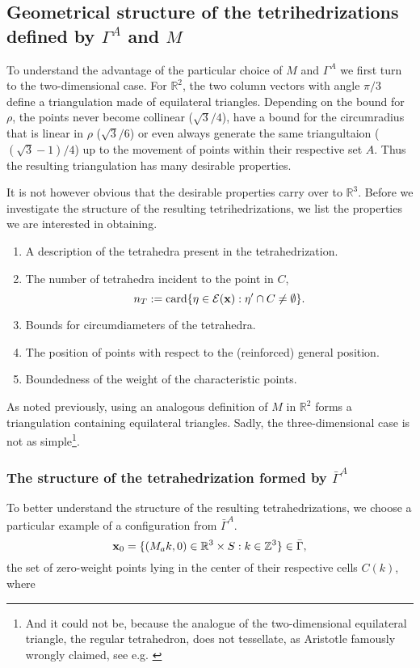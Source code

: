 \subsection{Geometrical structure of the tetrihedrizations defined by $\Gamma^A$ and $M$}
To understand the advantage of the particular choice of $M$ and $\Gamma^A$ we first turn to the two-dimensional case. For $\mathbb R^2$, the two column vectors with angle $\pi/3$ define a triangulation made of equilateral triangles. Depending on the bound for $\rho$, the points never become collinear ($\sqrt 3/4$), have a bound for the circumradius that is linear in $\rho$ ($\sqrt 3/6$) or even always generate the same triangultaion ($(\sqrt 3 - 1)/4$) up to the movement of points within their respective set $A$. Thus the resulting triangulation has many desirable properties. \newline

It is not however obvious that the desirable properties carry over to $\mathbb R^3$. Before we investigate the structure of the resulting tetrihedrizations, we list the properties we are interested in obtaining.
\begin{enumerate}
	\item A description of the tetrahedra present in the tetrahedrization.
	\item The number of tetrahedra incident to the point in $C$,  
		$$n_T := \mathrm{card} \{\eta \in \mathcal E({\mathbf{x}}): \eta' \cap C \neq \emptyset\}.$$
	\item Bounds for circumdiameters of the tetrahedra.
	\item The position of points with respect to the (reinforced) general position.  
	\item Boundedness of the weight of the characteristic points.
\end{enumerate}

As noted previously, using an analogous definition of $M$ in $\mathbb R^2$ forms a triangulation containing equilateral triangles. Sadly, the three-dimensional case is not as simple\footnote{And it could not be, because the analogue of the two-dimensional equilateral triangle, the regular tetrahedron, does not tessellate, as Aristotle famously wrongly claimed, see e.g. \cite{Lagarias12}}.

\subsubsection{The structure of the tetrahedrization formed by $\bar\Gamma^A$}
To better understand the structure of the resulting tetrahedrizations, we choose a particular example of a configuration from $\bar\Gamma^A$. 
$${\mathbf{x}}_0 = \{(M_ak,0) \in {\mathbb R^3}\times S: k \in \mathbb Z^3\} \in \bar\Gamma,$$ 
the set of zero-weight points lying in the center of their respective cells $C(k)$, where

